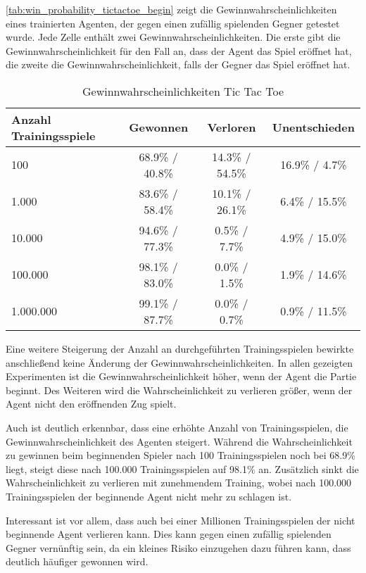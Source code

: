 \documentclass[11pt]{scrartcl}
\begin{document}
\autoref{tab:win_probability_tictactoe_begin} zeigt die Gewinnwahrscheinlichkeiten eines
trainierten Agenten, der gegen einen zufällig spielenden Gegner getestet wurde. Jede Zelle
enthält zwei Gewinnwahrscheinlichkeiten. Die erste gibt die Gewinnwahrscheinlichkeit für
den Fall an, dass der Agent das Spiel eröffnet hat, die zweite die
Gewinnwahrscheinlichkeit, falls der Gegner das Spiel eröffnet hat.
\begin{table}[ht]
  \begin{center}
    \begin{tabular}{l | c | c | c}
      Anzahl Trainingsspiele & Gewonnen & Verloren & Unentschieden \\
      \hline
      100 & 68.9\% / 40.8\% & 14.3\% / 54.5\% & 16.9\% / 4.7\% \\
      1.000 & 83.6\% / 58.4\% & 10.1\% / 26.1\% & 6.4\% / 15.5\% \\
      10.000 & 94.6\% / 77.3\% & 0.5\% / 7.7\% & 4.9\% / 15.0\% \\
      100.000 & 98.1\% / 83.0\% & 0.0\% / 1.5\% & 1.9\% / 14.6\% \\
      1.000.000 & 99.1\% / 87.7\% & 0.0\% / 0.7\% & 0.9\% / 11.5\% \\
    \end{tabular}

    \caption[Gewinnwahrscheinlichkeiten Tic-Tac-Toe]{Gewinnwahrscheinlichkeiten Tic Tac
    Toe}
    \label{tab:win_probability_tictactoe_begin}
  \end{center}
\end{table}

\noindent
Eine weitere Steigerung der Anzahl an durchgeführten Trainingsspielen bewirkte
anschließend keine Änderung der Gewinnwahrscheinlichkeiten. In allen gezeigten
Experimenten ist die Gewinnwahrscheinlichkeit höher, wenn der Agent die Partie beginnt.
Des Weiteren wird die Wahrscheinlichkeit zu verlieren größer, wenn der Agent nicht den
eröffnenden Zug spielt.

Auch ist deutlich erkennbar, dass eine erhöhte Anzahl von Trainingsspielen, die
Gewinnwahrscheinlichkeit des Agenten steigert. Während die Wahrscheinlichkeit zu gewinnen
beim beginnenden Spieler nach 100 Trainingsspielen noch bei 68.9\% liegt, steigt diese nach
100.000 Trainingsspielen auf 98.1\% an. Zusätzlich sinkt die Wahrscheinlichkeit zu verlieren mit
zunehmendem Training, wobei nach 100.000 Trainingsspielen der beginnende Agent nicht mehr zu
schlagen ist.

Interessant ist vor allem, dass auch bei einer Millionen Trainingsspielen der nicht
beginnende Agent verlieren kann. Dies kann gegen einen zufällig spielenden Gegner
vernünftig sein, da ein kleines Risiko einzugehen dazu führen kann, dass deutlich häufiger
gewonnen wird.
\end{document}
